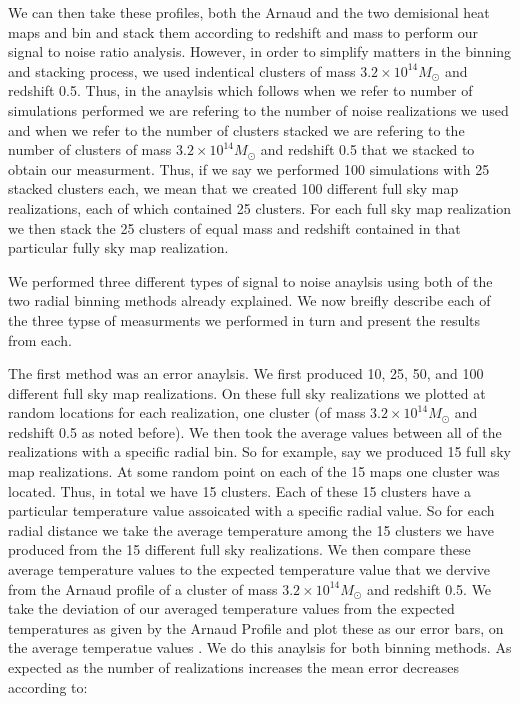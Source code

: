 \documentclass[12pt]{article} %
\begin{document}
We can then take these profiles, both the Arnaud and the two demisional heat maps and bin and stack them according to redshift and mass to perform our signal to noise ratio analysis. However, in order to simplify matters in the binning and stacking process, we used indentical clusters of mass $3.2\times 10^{14} M_{\odot}$ and redshift 0.5. Thus, in the anaylsis which follows when we refer to number of simulations performed we are refering to the number of noise realizations we used and when we refer to the number of clusters stacked we are refering to the number of clusters of mass $3.2\times 10^{14} M_{\odot}$ and redshift 0.5 that we stacked to obtain our measurment. Thus, if we say we performed 100 simulations with 25 stacked clusters each, we mean that we created 100 different full sky map realizations, each of which contained 25 clusters. For each full sky map realization we then stack the 25 clusters of equal mass and redshift contained in that particular fully sky map realization. 

 We performed three different types of signal to noise anaylsis using both of the two radial binning methods already explained.  We now breifly describe each of the three typse of measurments we performed in turn and present the results from each. 

The first method was an error anaylsis. We first produced 10, 25, 50, and 100 different full sky map realizations. On these full sky realizations we plotted at random locations for each realization, one cluster (of mass $3.2\times 10^{14} M_{\odot}$ and redshift 0.5 as noted before). We then took the average values between all of the realizations with a specific radial bin. So for example, say we produced 15 full sky map realizations. At some random point on each of the 15 maps one cluster was located.  Thus, in total we have 15 clusters. Each of these 15 clusters have a particular temperature value assoicated with a specific radial value. So for each radial distance we take the average temperature among the 15 clusters we have produced from the 15 different full sky realizations. We then compare these average temperature values to the expected temperature value that we dervive from the Arnaud profile of a cluster of mass $3.2\times 10^{14} M_{\odot}$ and redshift 0.5. We take the deviation of our averaged temperature values from the expected temperatures as given by the Arnaud Profile and plot these as our error bars, on the average temperatue values . We do this anaylsis for both binning methods. As expected as the number of realizations increases the mean error decreases according to:
\end{document}
